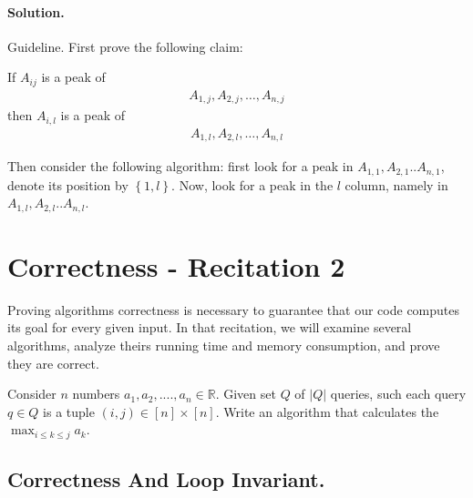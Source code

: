   \paragraph{Solution.} Guideline. First prove the following claim:  

  \begin{claim}
If $A_{ij}$ is a peak of 
\begin{equation*}
  \begin{split}
    A_{1,j}, A_{2,j}, \dots, A_{n,j}
  \end{split}
\end{equation*}
then $A_{i,l}$ is a peak of 
\begin{equation*}
  \begin{split}
    A_{1,l}, A_{2,l}, \dots, A_{n,l}
  \end{split}
\end{equation*}
  \end{claim}

Then consider the following algorithm: first look for a peak in $A_{1,1},A_{2,1}..A_{n,1}$, denote its position by $\left\{ 1,l \right\}$. Now, look for a peak in the $l$ column, namely in $A_{1,l},A_{2,l}..A_{n,l}$.
\fi 
\fi




    
\section{Correctness - Recitation 2} 
    Proving algorithms correctness is necessary to guarantee that our code computes its goal for every given input. In that recitation, we will examine several algorithms, analyze theirs running time and memory consumption, and prove they are correct.   


\begin{example}
Consider \(n\) numbers \(a_1,a_2,....,a_n \in \mathbb{R}\). Given set \(Q\) of \(|Q|\) queries, such each query \(q \in Q\) is a tuple \( (i,j) \in [n] \times [n] \). Write an algorithm that calculates the \(\max_{i\le k\le j}{a_k} \). 
\end{example}
\subsection{Correctness And Loop Invariant.}

